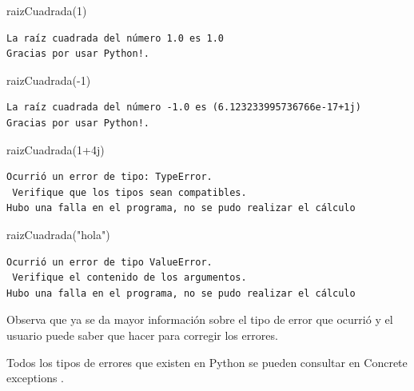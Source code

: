 \documentclass[
  spanish,
  letterpaper,
]{scrbook}
\newenvironment{Shaded}{\begin{snugshade}}{\end{snugshade}}
\newcommand{\DecValTok}[1]{\textcolor[rgb]{0.68,0.00,0.00}{#1}}
\newcommand{\NormalTok}[1]{\textcolor[rgb]{0.00,0.23,0.31}{#1}}
\newcommand{\OperatorTok}[1]{\textcolor[rgb]{0.37,0.37,0.37}{#1}}
\newcommand{\OtherTok}[1]{\textcolor[rgb]{0.00,0.23,0.31}{#1}}
\newcommand{\StringTok}[1]{\textcolor[rgb]{0.13,0.47,0.30}{#1}}
\theoremstyle{definition}
\theoremstyle{remark}
\begin{document}
\begin{Shaded}
\begin{Highlighting}[]
\NormalTok{raizCuadrada(}\DecValTok{1}\NormalTok{)}
\end{Highlighting}
\end{Shaded}

\begin{verbatim}
La raíz cuadrada del número 1.0 es 1.0
Gracias por usar Python!.
\end{verbatim}

\begin{Shaded}
\begin{Highlighting}[]
\NormalTok{raizCuadrada(}\OperatorTok{{-}}\DecValTok{1}\NormalTok{)}
\end{Highlighting}
\end{Shaded}

\begin{verbatim}
La raíz cuadrada del número -1.0 es (6.123233995736766e-17+1j)
Gracias por usar Python!.
\end{verbatim}

\begin{Shaded}
\begin{Highlighting}[]
\NormalTok{raizCuadrada(}\DecValTok{1}\OperatorTok{+}\OtherTok{4j}\NormalTok{)}
\end{Highlighting}
\end{Shaded}

\begin{verbatim}
Ocurrió un error de tipo: TypeError. 
 Verifique que los tipos sean compatibles.
Hubo una falla en el programa, no se pudo realizar el cálculo
\end{verbatim}

\begin{Shaded}
\begin{Highlighting}[]
\NormalTok{raizCuadrada(}\StringTok{"hola"}\NormalTok{)}
\end{Highlighting}
\end{Shaded}

\begin{verbatim}
Ocurrió un error de tipo ValueError. 
 Verifique el contenido de los argumentos.
Hubo una falla en el programa, no se pudo realizar el cálculo
\end{verbatim}

Observa que ya se da mayor información sobre el tipo de error que
ocurrió y el usuario puede saber que hacer para corregir los errores.

Todos los tipos de errores que existen en Python se pueden consultar en
Concrete exceptions .
\end{document}
